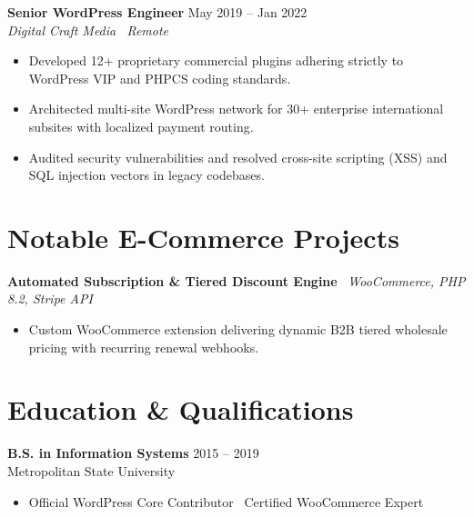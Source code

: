 \documentclass[10pt,a4paper]{article}
\begin{document}
\vspace{3pt}
\textbf{Senior WordPress Engineer} \hfill May 2019 -- Jan 2022\\
\textit{Digital Craft Media \textbar\ Remote}
\begin{itemize}
    \item Developed 12+ proprietary commercial plugins adhering strictly to WordPress VIP and PHPCS coding standards.
    \item Architected multi-site WordPress network for 30+ enterprise international subsites with localized payment routing.
    \item Audited security vulnerabilities and resolved cross-site scripting (XSS) and SQL injection vectors in legacy codebases.
\end{itemize}

\section{Notable E-Commerce Projects}
\textbf{Automated Subscription \& Tiered Discount Engine} \textbar\ \textit{WooCommerce, PHP 8.2, Stripe API}
\begin{itemize}
    \item Custom WooCommerce extension delivering dynamic B2B tiered wholesale pricing with recurring renewal webhooks.
\end{itemize}

\section{Education \& Qualifications}
\textbf{B.S. in Information Systems} \hfill 2015 -- 2019\\
Metropolitan State University
\begin{itemize}
    \item Official WordPress Core Contributor \textbar\ Certified WooCommerce Expert
\end{itemize}
\end{document}
